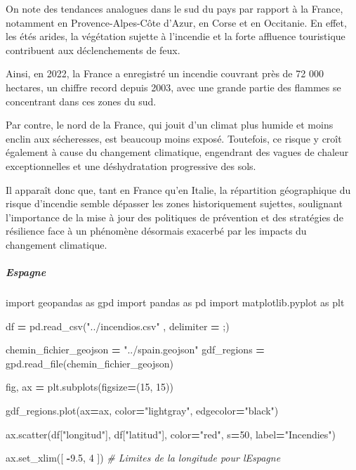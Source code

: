 \documentclass[
]{article}
\newenvironment{Shaded}{\begin{snugshade}}{\end{snugshade}}
\newcommand{\CommentTok}[1]{\textcolor[rgb]{0.56,0.35,0.01}{\textit{#1}}}
\newcommand{\DecValTok}[1]{\textcolor[rgb]{0.00,0.00,0.81}{#1}}
\newcommand{\FloatTok}[1]{\textcolor[rgb]{0.00,0.00,0.81}{#1}}
\newcommand{\ImportTok}[1]{#1}
\newcommand{\NormalTok}[1]{#1}
\newcommand{\OperatorTok}[1]{\textcolor[rgb]{0.81,0.36,0.00}{\textbf{#1}}}
\newcommand{\StringTok}[1]{\textcolor[rgb]{0.31,0.60,0.02}{#1}}
\begin{document}
On note des tendances analogues dans le sud du pays par rapport à la
France, notamment en Provence-Alpes-Côte d'Azur, en Corse et en
Occitanie. En effet, les étés arides, la végétation sujette à l'incendie
et la forte affluence touristique contribuent aux déclenchements de
feux.

Ainsi, en 2022, la France a enregistré un incendie couvrant près de 72
000 hectares, un chiffre record depuis 2003, avec une grande partie des
flammes se concentrant dans ces zones du sud.

Par contre, le nord de la France, qui jouit d'un climat plus humide et
moins enclin aux sécheresses, est beaucoup moins exposé. Toutefois, ce
risque y croît également à cause du changement climatique, engendrant
des vagues de chaleur exceptionnelles et une déshydratation progressive
des sols.

Il apparaît donc que, tant en France qu'en Italie, la répartition
géographique du risque d'incendie semble dépasser les zones
historiquement sujettes, soulignant l'importance de la mise à jour des
politiques de prévention et des stratégies de résilience face à un
phénomène désormais exacerbé par les impacts du changement climatique.

\subparagraph{Espagne}\label{espagne}

\begin{Shaded}
\begin{Highlighting}[]
\ImportTok{import}\NormalTok{ geopandas }\ImportTok{as}\NormalTok{ gpd}
\ImportTok{import}\NormalTok{ pandas }\ImportTok{as}\NormalTok{ pd}
\ImportTok{import}\NormalTok{ matplotlib.pyplot }\ImportTok{as}\NormalTok{ plt}

\NormalTok{df }\OperatorTok{=}\NormalTok{ pd.read\_csv(}\StringTok{"../incendios.csv"}\NormalTok{ , delimiter }\OperatorTok{=} \StringTok{\textquotesingle{};\textquotesingle{}}\NormalTok{)}

\NormalTok{chemin\_fichier\_geojson }\OperatorTok{=} \StringTok{"../spain.geojson"}  
\NormalTok{gdf\_regions }\OperatorTok{=}\NormalTok{ gpd.read\_file(chemin\_fichier\_geojson)}

\NormalTok{fig, ax }\OperatorTok{=}\NormalTok{ plt.subplots(figsize}\OperatorTok{=}\NormalTok{(}\DecValTok{15}\NormalTok{, }\DecValTok{15}\NormalTok{))  }

\NormalTok{gdf\_regions.plot(ax}\OperatorTok{=}\NormalTok{ax, color}\OperatorTok{=}\StringTok{"lightgray"}\NormalTok{, edgecolor}\OperatorTok{=}\StringTok{"black"}\NormalTok{)}

\NormalTok{ax.scatter(df[}\StringTok{"longitud"}\NormalTok{], df[}\StringTok{"latitud"}\NormalTok{], color}\OperatorTok{=}\StringTok{"red"}\NormalTok{, s}\OperatorTok{=}\DecValTok{50}\NormalTok{, label}\OperatorTok{=}\StringTok{"Incendies"}\NormalTok{)}

\NormalTok{ax.set\_xlim([ }\OperatorTok{{-}}\FloatTok{9.5}\NormalTok{, }\DecValTok{4}\NormalTok{ ])  }\CommentTok{\# Limites de la longitude pour l\textquotesingle{}Espagne}
\end{Highlighting}
\end{Shaded}
\end{document}
